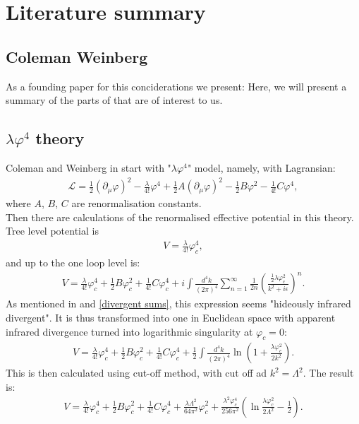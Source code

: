 \chapter{Literature summary}

\section{Coleman Weinberg}\label{CWchapter}
As a founding paper for this conciderations we present:
Here, we will present a summary of the parts of \citeColWein that are of interest to us. \\

\section{\texorpdfstring{$\lambda\varphi^4$}{Lambda phi to the fourth} theory}
Coleman and Weinberg in \cite{Coleman1973} start with "$\lambda\varphi^4$" model, namely, with 
Lagransian:
\begin{align}
\mathcal{L} = \frac{1}{2}(\partial_\mu\varphi)^2-\frac{\lambda}{4!}\varphi^4+\frac{1}{2}
A(\partial_\mu\varphi)^2-\frac{1}{2}B\varphi^2-\frac{1}{4!}C\varphi^4,
\end{align}
where $A$, $B$, $C$ are renormalisation constants. \\
Then there are calculations of the renormalised effective potential in this theory. \\
Tree level potential is
\begin{align}
V=\frac{\lambda}{4!}\varphi_c^4,
\end{align}
and up to the one loop level is:
\begin{align}
V = \frac{\lambda}{4!}\varphi_c^4+\frac{1}{2}B\varphi_c^2+\frac{1}{4!}C\varphi_c^4 + 
i\int\frac{d^4k}{(2\pi)^4}\sum\limits_{n=1}^\infty\frac{1}{2n}
\left(\frac{\frac{1}{2}\lambda\varphi_c^2}{k^2+i\epsilon}\right)^n.
\end{align} 
As mentioned in \cite{Coleman1973} and 
\ref{divergent sums}, this expression seems "hideously infrared divergent". It is thus transformed 
into one in Euclidean space with apparent infrared divergence turned into logarithmic 
singularity at $\varphi_c=0$:
\begin{align}
V=\frac{\lambda}{4!}\varphi_c^4+\frac{1}{2}B\varphi_c^2+\frac{1}{4!}C\varphi_c^4 +
\frac{1}{2}\int\frac{d^4k}{(2\pi)^4}\ln\left(1+\frac{\lambda\varphi_c^2}{2k^2}\right).
\end{align}
This is then calculated using cut-off method, with cut off ad $k^2 = \Lambda^2$. 
The result is:
\begin{align}
V=\frac{\lambda}{4!}\varphi_c^4+\frac{1}{2}B\varphi_c^2+\frac{1}{4!}C\varphi_c^4+
\frac{\lambda\Lambda^2}{64\pi^2}\varphi_c^2+\frac{\lambda^2\varphi_c^4}{256\pi^2}
\left(\ln\frac{\lambda\varphi_c^2}{2\Lambda^2}-\frac{1}{2}\right).
\end{align}
